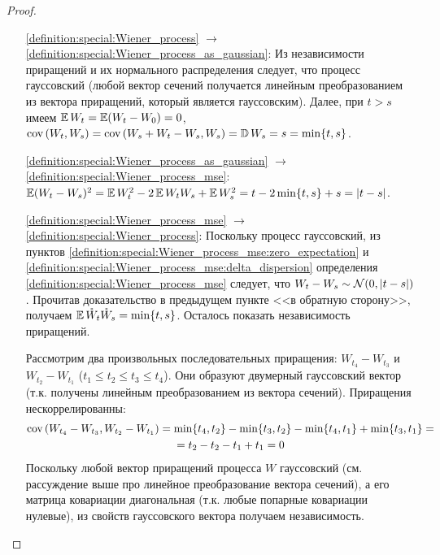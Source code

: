 \begin{proof}
    \begin{enumerate}
        \item[]
        \item[\ref{definition:special:Wiener_process} $ \to $ \ref{definition:special:Wiener_process_as_gaussian}:]
            Из независимости приращений и их нормального распределения следует, что процесс гауссовский
            (любой вектор сечений получается линейным преобразованием из вектора приращений, который является гауссовским).
            Далее, при $ t > s $ имеем $ \operatorname{\mathbb{E}} W_t = \operatorname{\mathbb{E}} (W_t - W_0) = 0 $, $ \textnormal{cov}\left(W_t, W_s\right) = \textnormal{cov}\left(W_s + W_t - W_s, W_s\right) = \operatorname{\mathbb{D}} W_s = s = \min \{ t, s \} $.
        \item[\ref{definition:special:Wiener_process_as_gaussian} $ \to $ \ref{definition:special:Wiener_process_mse}:]
            $ \operatorname{\mathbb{E}} (W_t - W_s)^2 = \operatorname{\mathbb{E}} W_t^2 - 2 \operatorname{\mathbb{E}} W_t W_s + \operatorname{\mathbb{E}} W_s^2 = t - 2 \min \{ t, s \} + s = |t - s| $.
        \item[\ref{definition:special:Wiener_process_mse} $ \to $ \ref{definition:special:Wiener_process}:]
            Поскольку процесс гауссовский, из пунктов \ref{definition:special:Wiener_process_mse:zero_expectation} и \ref{definition:special:Wiener_process_mse:delta_dispersion}
            определения \ref{definition:special:Wiener_process_mse} следует, что $ W_t - W_s \sim \mathcal{N}(0, |t - s|) $.
            Прочитав доказательство в предыдущем пункте <<в обратную сторону>>, получаем $ \operatorname{\mathbb{E}} \mathring{W}_t \mathring{W}_s = \min \{t, s\} $.
            Осталось показать независимость приращений.

            Рассмотрим два произвольных последовательных приращения: $ W_{t_4} - W_{t_3} $ и $ W_{t_2} - W_{t_1} $
            ($ t_1 \leqslant t_2 \leqslant t_3 \leqslant t_4 $).
            Они образуют двумерный гауссовский вектор (т.к. получены линейным преобразованием из вектора сечений).
            Приращения нескоррелированны:
            \begin{multline*}
                \textnormal{cov}\left(W_{t_4} - W_{t_3}, W_{t_2} - W_{t_1}\right) = \min\{t_4, t_2\} - \min\{t_3, t_2\} - \min\{t_4, t_1\} + \min\{t_3, t_1\} = \\
                = t_2 - t_2 - t_1 + t_1 = 0
            \end{multline*}
            Поскольку любой вектор приращений процесса $ W $ гауссовский (см. рассуждение выше про линейное преобразование вектора сечений),
            а его матрица ковариации диагональная (т.к. любые попарные ковариации нулевые),
            из свойств гауссовского вектора получаем независимость.
    \end{enumerate}
\end{proof}

